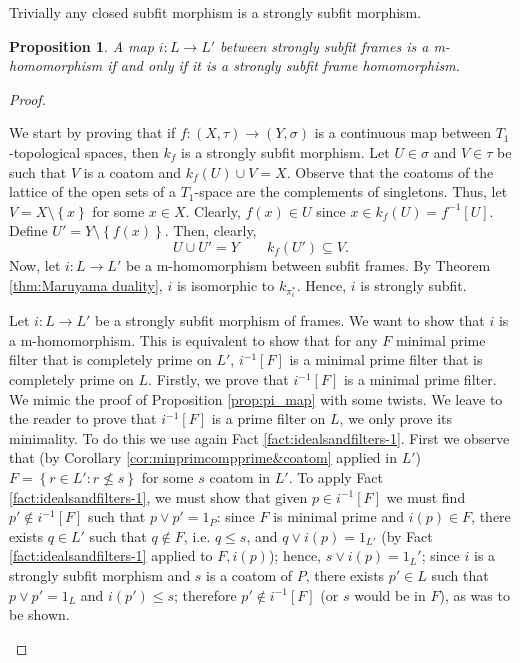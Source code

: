 \documentclass{article}
\theoremstyle{plain}
\newtheorem{proposition}[theorem]{Proposition}
\theoremstyle{definition}
\theoremstyle{remark}
\newcommand{\bp}[1]{\left\lbrace #1 \right\rbrace}
\newcommand{\0}{\mathbbm 0}
\newcommand{\1}{\mathbbm 1}
\newcommand{\2}{\mathbbm 2}
\begin{document}
 Trivially any closed subfit morphism is a strongly subfit morphism. 




 
 \begin{proposition}
     \label{prop:charsubfitmorphism}
A map \(i:L \to L'\) between strongly subfit frames is a m-homomorphism if and only if it is a strongly subfit frame homomorphism. 
 \end{proposition}
\begin{proof} \( \)   
        
        \begin{description}[font=\normalfont\itshape]
        \item[\((\Rightarrow).\)] We start by proving that if \(f:(X,\tau) \to (Y,\sigma)\) is a continuous map between \(T_1\)-topological spaces, then \(k_f\) is a strongly subfit morphism. Let $U \in \sigma$ and $V \in \tau$ be such that \(V\) is a coatom and  $k_f(U) \cup V = X$. Observe that the coatoms of the lattice of the open sets of a \(T_1\)-space are the complements of singletons. Thus, let \(V=X \setminus \bp{x}\) for some \(x \in X\). Clearly, \(f(x) \in U\) since \(x \in k_f(U)=f^{-1}[U]\). Define \(U'=Y \setminus \bp{f(x)}\). Then, clearly, \[
    U \cup U'=Y \quad \quad k_f(U') \subseteq V.
    \]
    Now,    let \(i:L \to L'\) be a m-homomorphism between subfit frames. By Theorem \ref{thm:Maruyama duality},   \(i\) is isomorphic to \(k_{\pi^*_i}\). Hence,  \(i\) is strongly subfit.
        \item[\((\Leftarrow).\)] Let  \(i:L \to L'\) be a strongly subfit morphism of frames. We want to show that \(i\) is a m-homomorphism. This is equivalent to show that for any \(F\) minimal prime filter that is completely prime on \(L'\), \(i^{-1}[F]\) is a minimal prime filter that is completely prime on \(L\). Firstly, we prove that \(i^{-1}[F]\) is a minimal prime filter. We mimic the proof of Proposition \ref{prop:pi_map} with some twists. We leave to the reader to prove that $ i^{-1}[F]$ is a prime filter on $L$,  we only prove its minimality. 
To do this we use again Fact \ref{fact:idealsandfilters-1}.
First we observe that (by Corollary \ref{cor:minprimcompprime&coatom} applied in $L'$) 
\(F=\bp{r \in L': r \not \leq s}\) for some \(s\) coatom in \(L'\). To apply Fact \ref{fact:idealsandfilters-1}, we must show that given $p \in  i^{-1}[F] $
we must find $p'\notin  i^{-1}[F]$ such that $p\vee p'=1_P$: since $F$ is minimal prime and $i(p)\in F$, there exists $q \in L'$ such that $q \notin F$, i.e. \(q \leq s\), and $q \vee i(p) =1_{L'}$  (by Fact \ref{fact:idealsandfilters-1} applied to $F,i(p)$); hence, \(s \vee i(p)=1_L'\); since $i$ is a strongly subfit morphism and $s$ is a coatom of $P$, there exists $p' \in L$ such that $p \vee p' =1_L$ and $i(p') \leq s$; therefore $p' \notin i^{-1}[F]$ (or \(s\) would be in \(F\)), as was to be shown. 


\end{description}
\end{proof}
\end{document}
